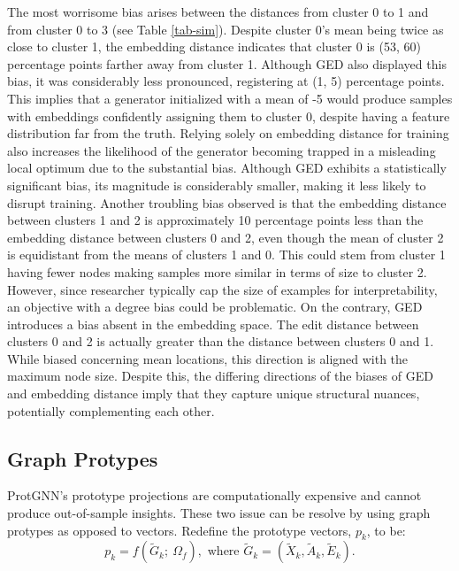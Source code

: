\documentclass[
  11pt,
  letterpaper,
]{article}
\begin{document}
\quad The most worrisome bias arises between the distances from cluster
0 to 1 and from cluster 0 to 3 (see Table \ref{tab-sim}). Despite
cluster 0's mean being twice as close to cluster 1, the embedding
distance indicates that cluster 0 is (53, 60) percentage points farther
away from cluster 1. Although GED also displayed this bias, it was
considerably less pronounced, registering at (1, 5) percentage points.
This implies that a generator initialized with a mean of -5 would
produce samples with embeddings confidently assigning them to cluster 0,
despite having a feature distribution far from the truth. Relying solely
on embedding distance for training also increases the likelihood of the
generator becoming trapped in a misleading local optimum due to the
substantial bias. Although GED exhibits a statistically significant
bias, its magnitude is considerably smaller, making it less likely to
disrupt training. Another troubling bias observed is that the embedding
distance between clusters 1 and 2 is approximately 10 percentage points
less than the embedding distance between clusters 0 and 2, even though
the mean of cluster 2 is equidistant from the means of clusters 1 and 0.
This could stem from cluster 1 having fewer nodes making samples more
similar in terms of size to cluster 2. However, since researcher
typically cap the size of examples for interpretability, an objective
with a degree bias could be problematic. On the contrary, GED introduces
a bias absent in the embedding space. The edit distance between clusters
0 and 2 is actually greater than the distance between clusters 0 and 1.
While biased concerning mean locations, this direction is aligned with
the maximum node size. Despite this, the differing directions of the
biases of GED and embedding distance imply that they capture unique
structural nuances, potentially complementing each other.

\hypertarget{graph-protypes}{%
\subsection{Graph Protypes}\label{graph-protypes}}

\quad ProtGNN's prototype projections are computationally expensive and
cannot produce out-of-sample insights. These two issue can be resolve by
using graph protypes as opposed to vectors. Redefine the prototype
vectors, \(p_k\), to be: \begin{equation}
    p_k = f(\tilde{G}_k; \ \Omega_f), \text{ where } \tilde{G}_k = (\tilde{X}_k, \tilde{A}_k, \tilde{E}_k).
\end{equation}
\end{document}
